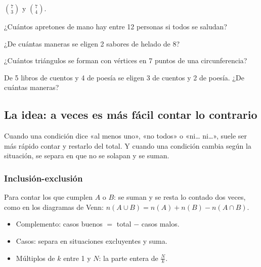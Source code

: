 \taller
{}
\begin{ejercicios}
\item $\binom{7}{3}$ y $\binom{7}{4}$. 
\item ¿Cuántos apretones de mano hay entre 12 personas si todos se saludan? 
\item ¿De cuántas maneras se eligen 2 sabores de helado de 8? 
\end{ejercicios}
\begin{ejercicios}
\item ¿Cuántos triángulos se forman con vértices en 7 puntos de una circunferencia?
\item De 5 libros de cuentos y 4 de poesía se eligen 3 de cuentos y 2 de poesía. ¿De cuántas maneras?
\end{ejercicios}

\bitacora


\subsection{La idea: a veces es más fácil contar lo contrario}
Cuando una condición dice «al menos uno», «no todos» o «ni… ni…», suele ser más rápido contar  y
restarlo del total. Y cuando una condición cambia según la situación, se separa en  que no se solapan y se
suman.

\subsubsection{Inclusión-exclusión}
Para contar los que cumplen $A$ o $B$: se suman y se resta lo contado dos veces, como en los diagramas de Venn:
$n(A \cup B) = n(A) + n(B) - n(A \cap B)$.

\begin{regla}
\begin{itemize}
  \item Complemento: casos buenos $=$ total $-$ casos malos.
  \item Casos: separa en situaciones excluyentes y suma.
  \item Múltiplos de $k$ entre 1 y $N$: la parte entera de $\tfrac Nk$.
\end{itemize}
\end{regla}

